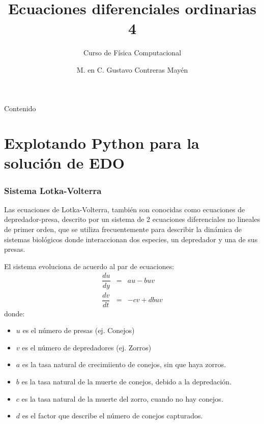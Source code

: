 

\usepackage{siunitx}
\usepackage[american,cuteinductors,smartlabels]{circuitikz}
\usetikzlibrary{calc}
\title{Ecuaciones diferenciales ordinarias 4}
\subtitle{Curso de F\'{i}sica Computacional}
\author{M. en C. Gustavo Contreras May\'{e}n}

\maketitle
\fontsize{14}{14}\selectfont
{}
\begin{frame}{Contenido}
\tableofcontents[pausesections]
\end{frame}
\section{Explotando Python para la soluci\'{o}n de EDO}
\begin{frame}
\frametitle{Sistema Lotka-Volterra}
Las ecuaciones de Lotka-Volterra, tambi\'{e}n son conocidas como ecuaciones de depredador-presa, descrito por un sistema de 2 ecuaciones diferenciales no lineales de primer orden, que se utiliza frecuentemente para describir la din\'{a}mica de sistemas biol\'{o}gicos donde interaccionan dos especies, un depredador y una de sus presas.
\end{frame}
\begin{frame}
El sistema evoluciona de acuerdo al par de ecuaciones:
\begin{eqnarray*}
\dfrac{du}{dy} &=& au - buv \\
\dfrac{dv}{dt} &=& -cv + dbuv
\end{eqnarray*}
donde:
\fontsize{10}{10}\selectfont
\begin{itemize}
\item $u$ es el n\'{u}mero de presas (ej. Conejos)
\item $v$ es el n\'{u}mero de depredadores (ej. Zorros)
\item $a$ es la tasa natural de crecimiiento de conejos, sin que haya zorros.
\item $b$ es la tasa natural de la muerte de conejos, debido a la depredaci\'{o}n.
\item $c$ es la tasa natural de la muerte del zorro, cuando no hay conejos.
\item $d$ es el factor que describe el n\'{u}mero de conejos capturados.
\end{itemize}
\end{frame}
